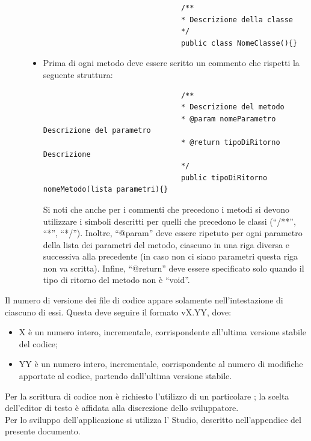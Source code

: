 \begin{description}
\begin{itemize}
							\begin{lstlisting}
								/**
								* Descrizione della classe
								*/
								public class NomeClasse(){}
							\end{lstlisting}
							\item Prima di ogni metodo deve essere scritto un commento che rispetti la seguente struttura:
							\begin{lstlisting}
								/**
								* Descrizione del metodo
								* @param nomeParametro Descrizione del parametro 
								* @return tipoDiRitorno Descrizione 
								*/
								public tipoDiRitorno nomeMetodo(lista parametri){}
							\end{lstlisting}
							Si noti che anche per i commenti che precedono i metodi si devono utilizzare i simboli descritti per quelli che precedono le classi (“/**”, “*”, “*/”). Inoltre, “@param” deve essere ripetuto per ogni parametro della lista dei parametri del metodo, ciascuno in una riga diversa e successiva alla precedente (in caso non ci siano parametri questa riga non va scritta). Infine, “@return” deve essere specificato solo quando il tipo di ritorno del metodo non è “void”.
						\end{itemize}
			\end{description}
			 \label{sec:versionecodice}
			Il numero di versione dei file di codice appare solamente nell'intestazione di ciascuno di essi. Questa deve seguire il formato vX.YY, dove:
			\begin{itemize}
				\item X è un numero intero, incrementale, corrispondente all'ultima versione stabile del codice;
				\item YY è un numero intero, incrementale, corrispondente al numero di modifiche apportate al codice, partendo dall'ultima versione stabile.
			\end{itemize}
			Per la scrittura di codice  non è richiesto l'utilizzo di un particolare ; la scelta dell'editor di testo è affidata alla discrezione dello sviluppatore.\\
			Per lo sviluppo dell'applicazione  si utilizza l'  Studio, descritto nell'appendice  del presente documento.